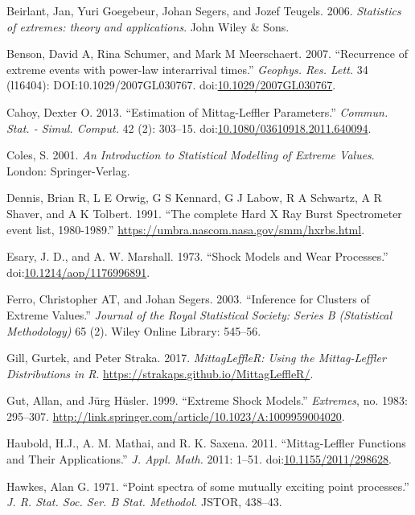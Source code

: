 \documentclass[smallextended]{svjour3}       %
\begin{document}
\hypertarget{ref-beirlantBook}{}
Beirlant, Jan, Yuri Goegebeur, Johan Segers, and Jozef Teugels. 2006.
\emph{Statistics of extremes: theory and applications}. John Wiley \&
Sons.

\hypertarget{ref-Benson2007}{}
Benson, David A, Rina Schumer, and Mark M Meerschaert. 2007.
``Recurrence of extreme events with power-law interarrival times.''
\emph{Geophys. Res. Lett.} 34 (l16404): DOI:10.1029/2007GL030767.
doi:\href{https://doi.org/10.1029/2007GL030767}{10.1029/2007GL030767}.

\hypertarget{ref-Cahoy2013}{}
Cahoy, Dexter O. 2013. ``Estimation of Mittag-Leffler Parameters.''
\emph{Commun. Stat. - Simul. Comput.} 42 (2): 303--15.
doi:\href{https://doi.org/10.1080/03610918.2011.640094}{10.1080/03610918.2011.640094}.

\hypertarget{ref-ColesBook}{}
Coles, S. 2001. \emph{An Introduction to Statistical Modelling of
Extreme Values}. London: Springer-Verlag.

\hypertarget{ref-HXRBS}{}
Dennis, Brian R, L E Orwig, G S Kennard, G J Labow, R A Schwartz, A R
Shaver, and A K Tolbert. 1991. ``The complete Hard X Ray Burst
Spectrometer event list, 1980-1989.''
\url{https://umbra.nascom.nasa.gov/smm/hxrbs.html}.

\hypertarget{ref-Esary1973}{}
Esary, J. D., and A. W. Marshall. 1973. ``Shock Models and Wear
Processes.''
doi:\href{https://doi.org/10.1214/aop/1176996891}{10.1214/aop/1176996891}.

\hypertarget{ref-ferro2003inference}{}
Ferro, Christopher AT, and Johan Segers. 2003. ``Inference for Clusters
of Extreme Values.'' \emph{Journal of the Royal Statistical Society:
Series B (Statistical Methodology)} 65 (2). Wiley Online Library:
545--56.

\hypertarget{ref-MittagLeffleR}{}
Gill, Gurtek, and Peter Straka. 2017. \emph{MittagLeffleR: Using the
Mittag-Leffler Distributions in R}.
\url{https://strakaps.github.io/MittagLeffleR/}.

\hypertarget{ref-Gut1999}{}
Gut, Allan, and Jürg Hüsler. 1999. ``Extreme Shock Models.''
\emph{Extremes}, no. 1983: 295--307.
\url{http://link.springer.com/article/10.1023/A:1009959004020}.

\hypertarget{ref-Haubold11}{}
Haubold, H.J., A. M. Mathai, and R. K. Saxena. 2011. ``Mittag-Leffler
Functions and Their Applications.'' \emph{J. Appl. Math.} 2011: 1--51.
doi:\href{https://doi.org/10.1155/2011/298628}{10.1155/2011/298628}.

\hypertarget{ref-hawkes1971point}{}
Hawkes, Alan G. 1971. ``Point spectra of some mutually exciting point
processes.'' \emph{J. R. Stat. Soc. Ser. B Stat. Methodol.} JSTOR,
438--43.
\end{document}

